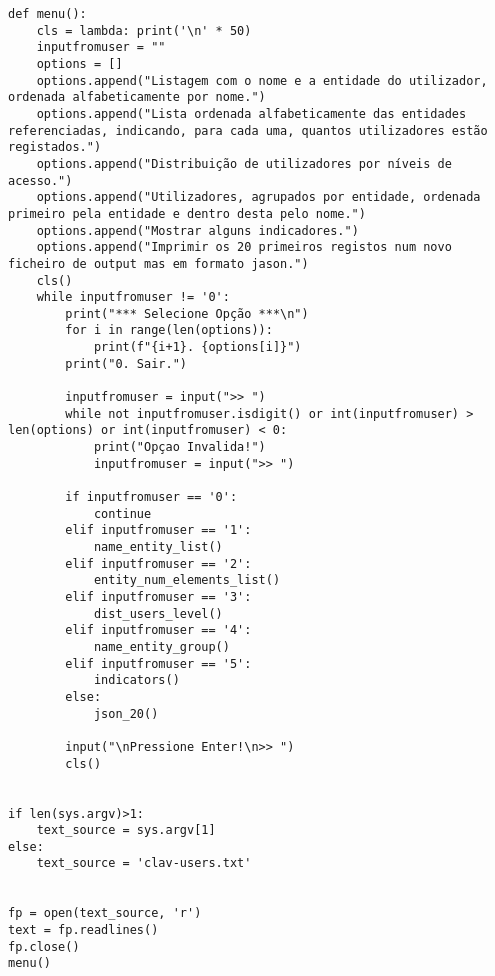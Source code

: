 \documentclass[11pt,a4paper]{report}%
\begin{document}
\begin{verbatim}
def menu():
    cls = lambda: print('\n' * 50)
    inputfromuser = ""
    options = []
    options.append("Listagem com o nome e a entidade do utilizador, ordenada alfabeticamente por nome.")
    options.append("Lista ordenada alfabeticamente das entidades referenciadas, indicando, para cada uma, quantos utilizadores estão registados.")
    options.append("Distribuição de utilizadores por níveis de acesso.")
    options.append("Utilizadores, agrupados por entidade, ordenada primeiro pela entidade e dentro desta pelo nome.")
    options.append("Mostrar alguns indicadores.")
    options.append("Imprimir os 20 primeiros registos num novo ficheiro de output mas em formato jason.")
    cls()
    while inputfromuser != '0':
        print("*** Selecione Opção ***\n")
        for i in range(len(options)):
            print(f"{i+1}. {options[i]}")
        print("0. Sair.")

        inputfromuser = input(">> ")
        while not inputfromuser.isdigit() or int(inputfromuser) > len(options) or int(inputfromuser) < 0:
            print("Opçao Invalida!")
            inputfromuser = input(">> ")

        if inputfromuser == '0':
            continue
        elif inputfromuser == '1':
            name_entity_list()
        elif inputfromuser == '2':
            entity_num_elements_list()
        elif inputfromuser == '3':
            dist_users_level()
        elif inputfromuser == '4':
            name_entity_group()
        elif inputfromuser == '5':
            indicators()
        else:
            json_20()

        input("\nPressione Enter!\n>> ")
        cls()


if len(sys.argv)>1:
    text_source = sys.argv[1]
else:
    text_source = 'clav-users.txt'


fp = open(text_source, 'r')
text = fp.readlines()
fp.close()
menu()


\end{verbatim}







\end{document}

